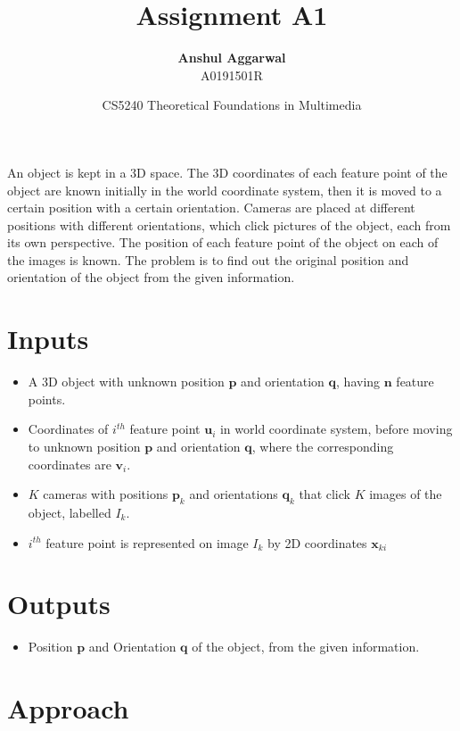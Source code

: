 \documentclass[12pt,a4paper]{article}
\title{Assignment A1}
\author{\textbf{Anshul Aggarwal}\\A0191501R}
\date{CS5240 Theoretical Foundations in Multimedia}
\begin{document}
\maketitle

%

An object is kept in a 3D space. The 3D coordinates of each feature point of the object are known initially in the world coordinate system, then it is moved to a certain position with a certain orientation. Cameras are placed at different positions with different orientations, which click pictures of the object, each from its own perspective. The position of each feature point of the object on each of the images is known. The problem is to find out the original position and orientation of the object from the given information. 

\section*{Inputs}

\begin{itemize}
    \item A 3D object with unknown position $\textbf{p}$ and orientation $\textbf{q}$, having $\textbf{n}$ feature points.
    \item Coordinates of $i^{th}$ feature point $\textbf{u}_i$ in world coordinate system, before moving to unknown position $\textbf{p}$ and orientation $\textbf{q}$, where the corresponding coordinates are $\textbf{v}_i$.
    \item $K$ cameras with positions $\textbf{p}_k$ and orientations $\textbf{q}_k$ that click $K$ images of the object, labelled $I_k$.
    \item $i^{th}$ feature point is represented on image $I_k$ by 2D coordinates $\textbf{x}_{ki}$
\end{itemize}

\section*{Outputs}

\begin{itemize}
    \item Position $\textbf{p}$ and Orientation $\textbf{q}$ of the object, from the given information.
\end{itemize}

\section*{Approach}
\end{document}
